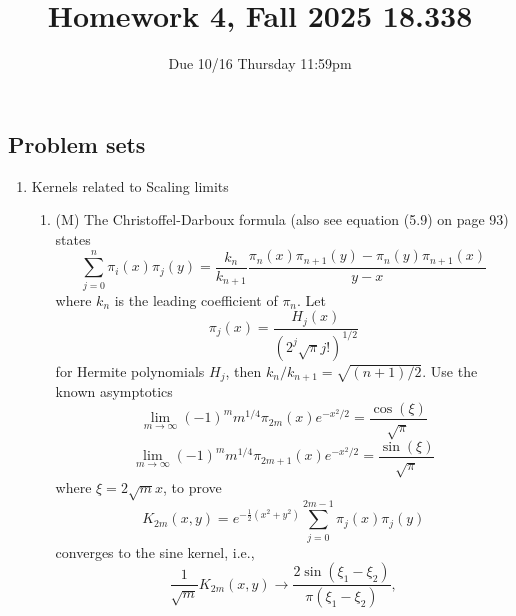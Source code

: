 \documentclass{article}
\title{Homework 4, Fall 2025 18.338}
\author{Due 10/16 Thursday 11:59pm}
\date{}
\begin{document}
\maketitle




\subsection*{Problem sets}
\begin{enumerate}
    \item Kernels related to Scaling limits
    \begin{enumerate}
        \item (M) The Christoffel-Darboux formula (also see equation (5.9) on page 93) states
        \begin{equation*}
            \sum_{j=0}^n\pi_i(x)\pi_j(y) = \frac{k_n}{k_{n+1}}\frac{\pi_n(x)\pi_{n+1}(y)-\pi_n(y)\pi_{n+1}(x)}{y-x}
        \end{equation*}
        where $k_n$ is the leading coefficient of $\pi_n$. Let 
        \begin{equation*}
            \pi_j(x) = \frac{H_j(x)}{(2^j\sqrt\pi j!)^{1/2}}
        \end{equation*}
        for Hermite polynomials $H_j$, then $k_n/k_{n+1} = \sqrt{ (n+1)/2}$. Use the known asymptotics
        \begin{equation*}
            \lim_{m\to\infty}(-1)^m m^{1/4}\pi_{2m}(x)e^{-x^2/2} = \frac{\cos(\xi)}{\sqrt{\pi}}
        \end{equation*}
        \begin{equation*}
            \lim_{m\to\infty}(-1)^m m^{1/4}\pi_{2m+1}(x)e^{-x^2/2} = \frac{\sin(\xi)}{\sqrt{\pi}}
        \end{equation*}
        where $\xi = 2\sqrt{m}x$, to prove 
        \begin{equation*}
            K_{2m}(x, y) = e^{-\frac{1}{2}(x^2+y^2)}\sum_{j=0}^{2m-1}\pi_j(x)\pi_j(y)
        \end{equation*}
        converges to the sine kernel, i.e., 
        \begin{equation*}
            \frac{1}{\sqrt{m}}K_{2m}(x, y) \to \frac{2\sin(\xi_1-\xi_2)}{\pi(\xi_1-\xi_2)},

\end{equation*}
\end{enumerate}
\end{enumerate}
\end{document}
